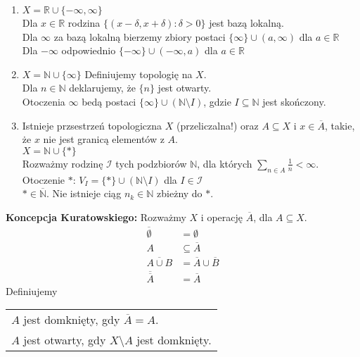 \begin{przy} \hfill 
    \begin{enumerate}[(1)]
        \item $X = \mathbb R \cup \{-\infty,\infty\}$ \\ 
            Dla $x \in \mathbb R$ rodzina $\{(x-\delta,x+\delta): \delta > 0\}$ jest bazą lokalną. \\
            Dla $\infty$ za bazą lokalną bierzemy zbiory postaci $\{\infty\} \cup (a,\infty)$ dla $a \in \mathbb R$\\
            Dla $-\infty$ odpowiednio $\{-\infty\} \cup (-\infty,a)$ dla $a \in \mathbb R$
        \item $X = \mathbb N \cup \{\infty\}$ Definiujemy topologię na $X$. \\ 
            Dla $n \in \mathbb N$ deklarujemy, że $\{n\}$ jest otwarty. \\ 
            Otoczenia $\infty$ bedą postaci $\{\infty\} \cup (\mathbb N \setminus I)$, gdzie $I \subseteq \mathbb N$
            jest skończony.
        \item Istnieje przsestrzeń topologiczna $X$ (przeliczalna!) oraz $A \subseteq X$ i $x \in \overline A$, 
            takie, że $x$ nie jest granicą elementów z $A$. \\ 
            $X = \mathbb N \cup \{ \ast \}$ \\
            Rozważmy rodzinę $\mathcal I$ tych podzbiorów $\mathbb N$, dla których $\sum\limits_{n \in A} 
            \frac{1}{n} < \infty$. \\ 
            Otoczenie $\ast$: $V_I = \{\ast\} \cup (\mathbb N \setminus I)$ dla $I \in \mathcal I$ \\ 
            $\ast \in \overline{\mathbb N}$. Nie istnieje ciąg $n_k \in \mathbb N$ zbieżny do $\ast$.
    \end{enumerate} 
\end{przy}
\textbf{Koncepcja Kuratowskiego:} Rozważmy $X$ i operację $\overline A$, dla $ A \subseteq X$.
\begin{align*}
    \overline \emptyset &= \emptyset \\  
    A &\subseteq \overline A \\ 
    \overline{ A \cup B} &= \overline A \cup \overline B \\ 
    \overline{\overline A} &= \overline A    
\end{align*}
Definiujemy \begin{tabular}[t]{l} $A$ jest domknięty, gdy $\overline A = A$. \\ 
$A$ jest otwarty, gdy $X \setminus A$ jest domknięty.\end{tabular} 
